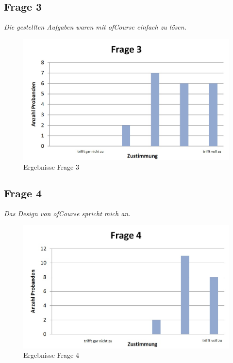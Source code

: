 \subsection{Frage 3}
\begin{center}
	{\it Die gestellten Aufgaben waren mit ofCourse einfach zu lösen.}
\end{center}
\begin{figure}[h]
\centering
\includegraphics[width=0.7\linewidth]{img/Frage3}
\caption{Ergebnisse Frage 3}
\label{fig:Frage3}
\end{figure}

\subsection{Frage 4}
\begin{center}
	{\it Das Design von ofCourse spricht mich an.}
\end{center}
\begin{figure}[h]
\centering
\includegraphics[width=0.7\linewidth]{img/Frage4}
\caption{Ergebnisse Frage 4}
\label{fig:Frage4}
\end{figure}


